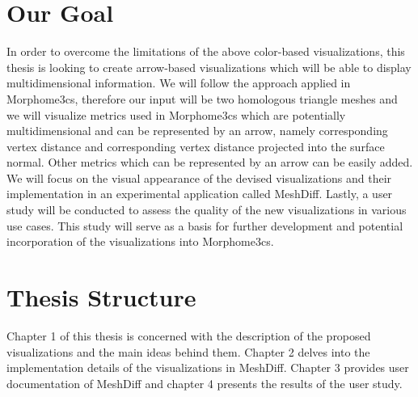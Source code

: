 \section*{Our Goal}

In order to overcome the limitations of the above color-based visualizations, this thesis is looking to create arrow-based visualizations which will be able to display multidimensional information. We will follow the approach applied in Morphome3cs, therefore our input will be two homologous triangle meshes and we will visualize metrics used in Morphome3cs which are potentially multidimensional and can be represented by an arrow, namely corresponding vertex distance and corresponding vertex distance projected into the surface normal. Other metrics which can be represented by an arrow can be easily added. We will focus on the visual appearance of the devised visualizations and their implementation in an experimental application called MeshDiff. Lastly, a user study will be conducted to assess the quality of the new visualizations in various use cases. This study will serve as a basis for further development and potential incorporation of the visualizations into Morphome3cs.
\section*{Thesis Structure}

Chapter 1 of this thesis is concerned with the description of the proposed visualizations and the main ideas behind them. Chapter 2 delves into the implementation details of the visualizations in MeshDiff. Chapter 3 provides user documentation of MeshDiff and chapter 4 presents the results of the user study.